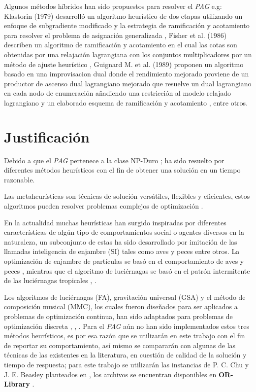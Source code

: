 \documentclass[letterpaper,10pt]{article}
\begin{document}
Algunos métodos híbridos han sido propuestos para resolver el \emph{PAG} e.g:
\newline 
Klastorin (1979) desarrolló un algoritmo heurístico de dos etapas utilizando un enfoque de subgradiente modificado y la estrategia de ramificación y acotamiento para resolver el problema de asignación generalizada \cite{4358754}, Fisher et al. (1986) describen un algoritmo de ramificación y acotamiento en el cual las cotas son obtenidas por una relajación lagrangiana con los conjuntos multiplicadores por un método de ajuste heurístico \cite{4358754}, Guignard M. et al. (1989) proponen un algoritmo basado en una improvisacion dual donde el rendimiento mejorado proviene de un productor de ascenso dual lagrangiano mejorado que resuelve un dual lagrangiano en cada nodo de enumeración añadiendo una restricción al modelo relajado lagrangiano y un elaborado esquema de ramificación y acotamiento \cite{4358754}, entre otros.
 	
\section{Justificación}

Debido a que el \emph{PAG} pertenece a la clase NP-Duro \cite{4358754}; ha sido  resuelto por diferentes métodos heurísticos con el fin de obtener una solución en un tiempo razonable.

Las metaheurísticas son técnicas de solución versátiles, flexibles y eficientes, estos algoritmos pueden resolver problemas complejos de optimización \cite{4358754} .
\newline

 En la actualidad muchas heurísticas han surgido inspiradas por diferentes características de algún tipo  de comportamientos social o agentes diversos en la naturaleza, un subconjunto de estas ha sido desarrollado por imitación de las llamadas inteligencia de enjambre (SI) tales como aves y peces entre otros. La optimización  de enjambre de partículas se basó en el comportamiento de aves y peces \cite{4358754}, mientras que el algoritmo de luciérnagas se basó en el patrón intermitente de las luciérnagas tropicales \cite{4358754}, \cite{4358754}.
\newline
 	
Los algoritmos de luciérnagas (FA), gravitación universal (GSA) y el método de composición musical (MMC), los cuales fueron diseñados para ser aplicados a problemas de optimización continua,  han sido adaptados para problemas de optimización discreta \cite{4358754}, \cite{4358754}, \cite{4358754}. 
Para el \emph{PAG} aún no han sido implementados estos tres métodos heurísticos, es por esa razón que se utilizarán en este trabajo con el fin de reportar su comportamiento, así mismo se compararán con algunas de las técnicas de las existentes en la literatura, en cuestión de calidad de la solución y tiempo de respuesta; para este trabajo se utilizarán las instancias de P. C. Chu y J. E. Beasley planteados en \cite{4358754}, los archivos se encuentran disponibles en \textbf{OR-Library} \cite{4358754}.
\end{document}
